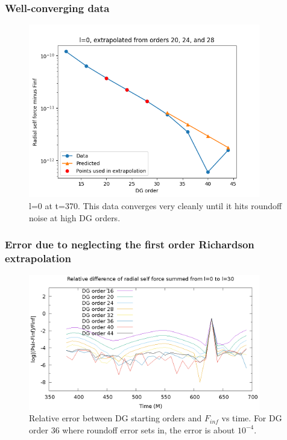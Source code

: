\documentclass{beamer}
\begin{document}
\begin{frame}
  \frametitle{Well-converging data}
  \begin{figure}
  \includegraphics[width=0.9\textwidth]{fittingtechniqet370l0}
  \caption{l=0 at t=370. This data converges very cleanly until it hits roundoff noise at high DG orders.}
  \end{figure}
\end{frame}
  

\begin{frame}
  \frametitle{Error due to neglecting the first order Richardson extrapolation}
  \begin{figure}
    \includegraphics[width=0.9\textwidth]{reldiffpsirvtwfinfdgorders2}
    \caption{Relative error between DG starting orders and $F_{inf}$ vs time. For DG order 36 where roundoff error sets in, the error is about $10^{-4}$.}
  \end{figure}
\end{frame}
\end{document}
